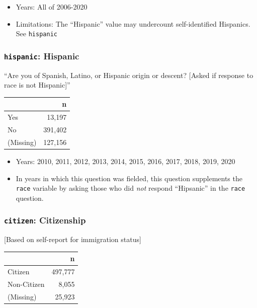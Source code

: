 \documentclass[10pt,article,oneside]{memoir}
\theoremstyle{definition}
\begin{document}
\begin{itemize}
\tightlist
\item
  Years: All of 2006-2020
\item
  Limitations: The ``Hispanic'' value may undercount self-identified
  Hispanics. See \texttt{hispanic}
\end{itemize}

\hypertarget{hispanic-hispanic}{%
\subsubsection{\texorpdfstring{\texttt{hispanic}:
Hispanic}{hispanic: Hispanic}}\label{hispanic-hispanic}}

``Are you of Spanish, Latino, or Hispanic origin or descent? {[}Asked if
response to race is not Hispanic{]}''

\begin{table}[H]
\centering
\begin{tabular}[t]{lr}
\toprule
 & n\\
\midrule
Yes & 13,197\\
No & 391,402\\
(Missing) & 127,156\\
\bottomrule
\end{tabular}
\end{table}

\begin{itemize}
\tightlist
\item
  Years: 2010, 2011, 2012, 2013, 2014, 2015, 2016, 2017, 2018, 2019,
  2020
\item
  In years in which this question was fielded, this question supplements
  the \texttt{race} variable by asking those who did \emph{not} respond
  ``Hipsanic'' in the \texttt{race} question.
\end{itemize}

\hypertarget{citizen-citizenship}{%
\subsubsection{\texorpdfstring{\texttt{citizen}:
Citizenship}{citizen: Citizenship}}\label{citizen-citizenship}}

{[}Based on self-report for immigration status{]}

\begin{table}[H]
\centering
\begin{tabular}[t]{lr}
\toprule
 & n\\
\midrule
Citizen & 497,777\\
Non-Citizen & 8,055\\
(Missing) & 25,923\\
\bottomrule
\end{tabular}
\end{table}
\end{document}
